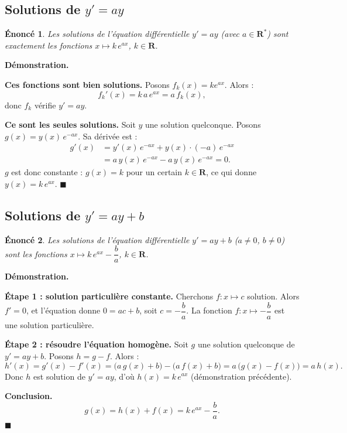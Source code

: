 \documentclass[11pt,a4paper]{article}
\theoremstyle{enoncestyle}
\newtheorem{enonce}{Énoncé}[section]
\renewenvironment{proof}[1][\proofname]{%
  \par\medskip
  \noindent\textbf{\color{black!70}#1.}\quad\itshape
}{%
  \hfill$\blacksquare$\par\medskip
}
\begin{document}
\subsection{Solutions de $y' = ay$}

\begin{mdframed}[linecolor=blue!40,backgroundcolor=blue!4,linewidth=1pt]
\begin{enonce}
Les solutions de l'équation différentielle $y' = ay$ (avec $a \in \mathbf{R}^*$)
sont exactement les fonctions $x \mapsto k\,e^{ax}$, $k \in \mathbf{R}$.
\end{enonce}
\end{mdframed}

\begin{proof}[Démonstration]
\textbf{Ces fonctions sont bien solutions.}
Posons $f_k(x) = ke^{ax}$. Alors :
\[
    f_k'(x) = k\,a\,e^{ax} = a\,f_k(x),
\]
donc $f_k$ vérifie $y' = ay$.

\textbf{Ce sont les seules solutions.}
Soit $y$ une solution quelconque. Posons $g(x) = y(x)\,e^{-ax}$. Sa dérivée est :
\begin{align*}
    g'(x) &= y'(x)\,e^{-ax} + y(x)\cdot(-a)\,e^{-ax} \\
          &= a\,y(x)\,e^{-ax} - a\,y(x)\,e^{-ax} = 0.
\end{align*}
$g$ est donc constante : $g(x) = k$ pour un certain $k \in \mathbf{R}$, ce qui donne
$y(x) = k\,e^{ax}$.
\end{proof}

\subsection{Solutions de $y' = ay + b$}

\begin{mdframed}[linecolor=blue!40,backgroundcolor=blue!4,linewidth=1pt]
\begin{enonce}
Les solutions de l'équation différentielle $y' = ay + b$ ($a \neq 0$, $b \neq 0$)
sont les fonctions $x \mapsto k\,e^{ax} - \dfrac{b}{a}$, $k \in \mathbf{R}$.
\end{enonce}
\end{mdframed}

\begin{proof}[Démonstration]
\textbf{Étape 1 : solution particulière constante.}
Cherchons $f : x \mapsto c$ solution. Alors $f'= 0$, et l'équation donne $0 = ac + b$,
soit $c = -\dfrac{b}{a}$. La fonction $f : x \mapsto -\dfrac{b}{a}$ est une solution
particulière.

\textbf{Étape 2 : résoudre l'équation homogène.}
Soit $g$ une solution quelconque de $y' = ay + b$. Posons $h = g - f$. Alors :
\[
    h'(x) = g'(x) - f'(x)
    = \bigl(a\,g(x) + b\bigr) - \bigl(a\,f(x) + b\bigr)
    = a\,\bigl(g(x) - f(x)\bigr) = a\,h(x).
\]
Donc $h$ est solution de $y' = ay$, d'où $h(x) = k\,e^{ax}$ (démonstration précédente).

\textbf{Conclusion.}
\[
    g(x) = h(x) + f(x) = k\,e^{ax} - \frac{b}{a}.
\]
\end{proof}
\end{document}
